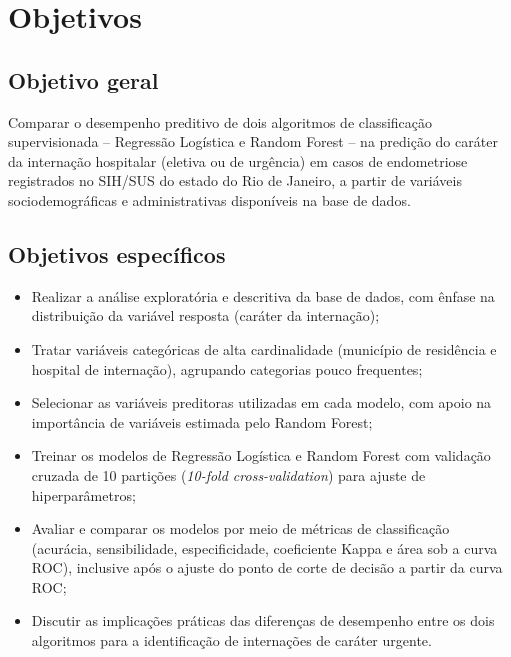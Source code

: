 \documentclass[12pt,a4paper]{article}
\begin{document}
\section{Objetivos}

\subsection*{Objetivo geral}

Comparar o desempenho preditivo de dois algoritmos de classificação supervisionada -- Regressão Logística e Random Forest -- na predição do caráter da internação hospitalar (eletiva ou de urgência) em casos de endometriose registrados no SIH/SUS do estado do Rio de Janeiro, a partir de variáveis sociodemográficas e administrativas disponíveis na base de dados.

\subsection*{Objetivos específicos}

\begin{itemize}
  \item Realizar a análise exploratória e descritiva da base de dados, com ênfase na distribuição da variável resposta (caráter da internação);
  \item Tratar variáveis categóricas de alta cardinalidade (município de residência e hospital de internação), agrupando categorias pouco frequentes;
  \item Selecionar as variáveis preditoras utilizadas em cada modelo, com apoio na importância de variáveis estimada pelo Random Forest;
  \item Treinar os modelos de Regressão Logística e Random Forest com validação cruzada de 10 partições (\textit{10-fold cross-validation}) para ajuste de hiperparâmetros;
  \item Avaliar e comparar os modelos por meio de métricas de classificação (acurácia, sensibilidade, especificidade, coeficiente Kappa e área sob a curva ROC), inclusive após o ajuste do ponto de corte de decisão a partir da curva ROC;
  \item Discutir as implicações práticas das diferenças de desempenho entre os dois algoritmos para a identificação de internações de caráter urgente.
\end{itemize}
\end{document}
